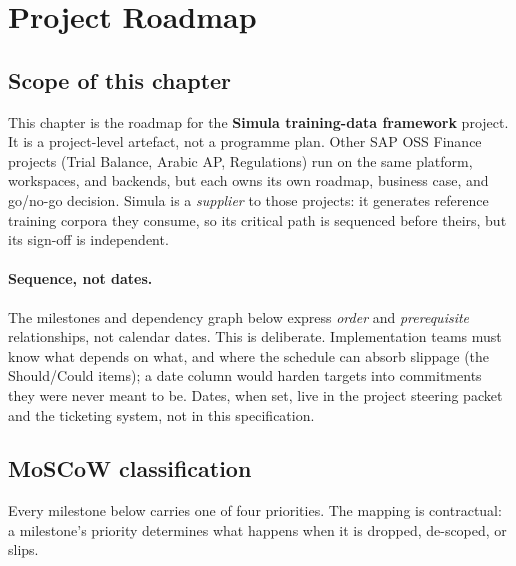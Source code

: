 \chapter{Project Roadmap}\label{sec:sim-roadmap}

\section*{Scope of this chapter}

This chapter is the roadmap for the \textbf{Simula training-data
framework} project. It is a project-level artefact, not a programme
plan. Other SAP OSS Finance projects (Trial Balance, Arabic AP,
Regulations) run on the same platform, workspaces, and backends, but
each owns its own roadmap, business case, and go/no-go decision.
Simula is a \emph{supplier} to those projects: it generates reference
training corpora they consume, so its critical path is sequenced
before theirs, but its sign-off is independent.

\subsubsection{Sequence, not dates.}
The milestones and dependency graph below express \emph{order} and
\emph{prerequisite} relationships, not calendar dates. This is
deliberate. Implementation teams must know what depends on what, and
where the schedule can absorb slippage (the Should/Could items); a
date column would harden targets into commitments they were never
meant to be. Dates, when set, live in the project steering packet and
the ticketing system, not in this specification.

\section{MoSCoW classification}\label{sec:sim-moscow}

Every milestone below carries one of four priorities. The mapping is
contractual: a milestone's priority determines what happens when it is
dropped, de-scoped, or slips.

